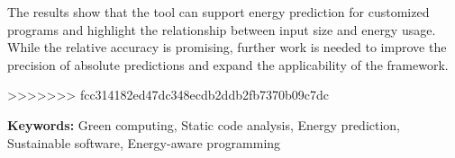 The results show that the tool can support energy prediction for customized programs and highlight the relationship between input size and energy usage. While the relative accuracy is promising, further work is needed to improve the precision of absolute predictions and expand the applicability of the framework.

>>>>>>> fcc314182ed47dc348ecdb2ddb2fb7370b09c7dc


\vfill

\begin{flushleft}
\textbf{Keywords:}
Green computing, Static code analysis, Energy prediction, Sustainable software, Energy-aware programming
\end{flushleft}

{}
